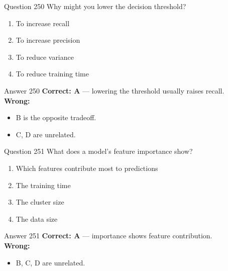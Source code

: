\documentclass[aspectratio=169,11pt]{beamer}
\begin{document}
	\begin{frame}{Question 250}
		Why might you lower the decision threshold?
		\begin{enumerate}[label=\Alph*.]
			\item To increase recall
			\item To increase precision
			\item To reduce variance
			\item To reduce training time
		\end{enumerate}
	\end{frame}
	\begin{frame}{Answer 250}
		\textbf{Correct: A} --- lowering the threshold usually raises recall.\\
		\vspace{0.5em}
		\textbf{Wrong:}
		\begin{itemize}
			\item B is the opposite tradeoff.
			\item C, D are unrelated.
		\end{itemize}
	\end{frame}
	
	\begin{frame}{Question 251}
		What does a model's feature importance show?
		\begin{enumerate}[label=\Alph*.]
			\item Which features contribute most to predictions		\item The training time
			\item The cluster size
			\item The data size
		\end{enumerate}
	\end{frame}
	\begin{frame}{Answer 251}
		\textbf{Correct: A} --- importance shows feature contribution.\\
		\vspace{0.5em}
		\textbf{Wrong:}
		\begin{itemize}
			\item B, C, D are unrelated.
		\end{itemize}
	\end{frame}
	
\end{document}
